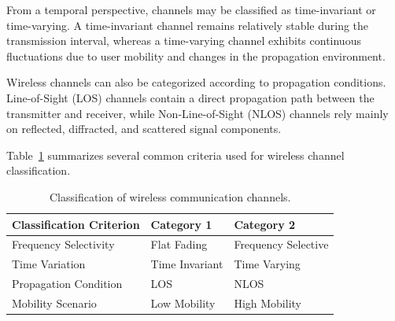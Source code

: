 From a temporal perspective, channels may be classified as time-invariant or time-varying. A time-invariant channel remains relatively stable during the transmission interval, whereas a time-varying channel exhibits continuous fluctuations due to user mobility and changes in the propagation environment.

Wireless channels can also be categorized according to propagation conditions. Line-of-Sight (LOS) channels contain a direct propagation path between the transmitter and receiver, while Non-Line-of-Sight (NLOS) channels rely mainly on reflected, diffracted, and scattered signal components.

Table~\ref{tab:channel_classification} summarizes several common criteria used for wireless channel classification.

\begin{table}[H]
\centering
\caption{Classification of wireless communication channels.}
\label{tab:channel_classification}

\begin{tabular}{|p{4cm}|p{4cm}|p{4cm}|}
\hline
\textbf{Classification Criterion} &
\textbf{Category 1} &
\textbf{Category 2} \\
\hline

Frequency Selectivity &
Flat Fading &
Frequency Selective \\
\hline

Time Variation &
Time Invariant &
Time Varying \\
\hline

Propagation Condition &
LOS &
NLOS \\
\hline

Mobility Scenario &
Low Mobility &
High Mobility \\
\hline

\end{tabular}

\end{table}

